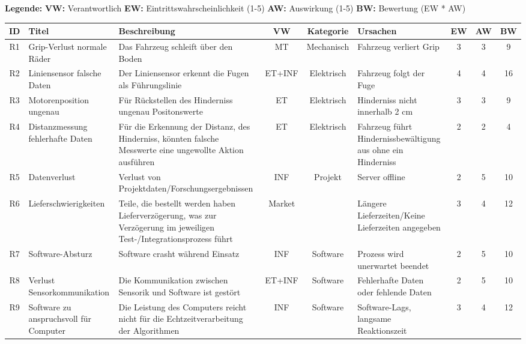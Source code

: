 \begin{landscape}
\newpage
\scriptsize

\textbf{Legende:}
\hspace{1cm}
\textbf{VW:} Verantwortlich
\hspace{1cm}
\textbf{EW:} Eintrittswahrscheinlichkeit (1-5)
\hspace{1cm}
\textbf{AW:} Auswirkung (1-5)
\hspace{1cm}
\textbf{BW:} Bewertung (EW * AW)

\begin{longtable}{|c|p{4cm}|p{6cm}|c|c|p{4cm}|c|c|c|}
\hline
\textbf{ID}  & \textbf{Titel} & \textbf{Beschreibung} & \textbf{VW} & \textbf{Kategorie} & \textbf{Ursachen} & \textbf{EW} & \textbf{AW} & \textbf{BW} \\ \hline
R1  & Grip-Verlust normale Räder & Das Fahrzeug schleift über den Boden & MT & Mechanisch & Fahrzeug verliert Grip & 3 & 3 & 9 \\ \hline
R2  & Liniensensor falsche Daten & Der Liniensensor erkennt die Fugen als Führungslinie & ET+INF & Elektrisch & Fahrzeug folgt der Fuge & 4 & 4 & 16 \\ \hline
R3  & Motorenposition ungenau & Für Rückstellen des Hinderniss ungenau Positonswerte & ET & Elektrisch & Hinderniss nicht innerhalb 2 cm & 3 & 3 & 9 \\ \hline
R4  & Distanzmessung fehlerhafte Daten & Für die Erkennung der Distanz, des Hinderniss, könnten falsche Messwerte eine ungewollte Aktion ausführen & ET & Elektrisch & Fahrzeug führt Hindernissbewältigung aus ohne ein Hinderniss & 2 & 2 & 4 \\ \hline
R5  & Datenverlust & Verlust von Projektdaten/Forschungsergebnissen & INF & Projekt & Server offline & 2 & 5 & 10 \\ \hline
R6  & Lieferschwierigkeiten & Teile, die bestellt werden haben Lieferverzögerung, was zur Verzögerung im jeweiligen Test-/Integrationsprozess führt & Market & & Längere Lieferzeiten/Keine Lieferzeiten angegeben & 3 & 4 & 12 \\ \hline
R7  & Software-Absturz & Software crasht während Einsatz & INF & Software & Prozess wird unerwartet beendet & 2 & 5 & 10 \\ \hline
R8  & Verlust Sensorkommunikation & Die Kommunikation zwischen Sensorik und Software ist gestört & ET+INF & Software & Fehlerhafte Daten oder fehlende Daten & 2 & 5 & 10 \\ \hline
R9  & Software zu anspruchsvoll für Computer & Die Leistung des Computers reicht nicht für die Echtzeitverarbeitung der Algorithmen & INF & Software & Software-Lags, langsame Reaktionszeit & 3 & 4 & 12 \\ \hline

\end{longtable}
\end{landscape}
